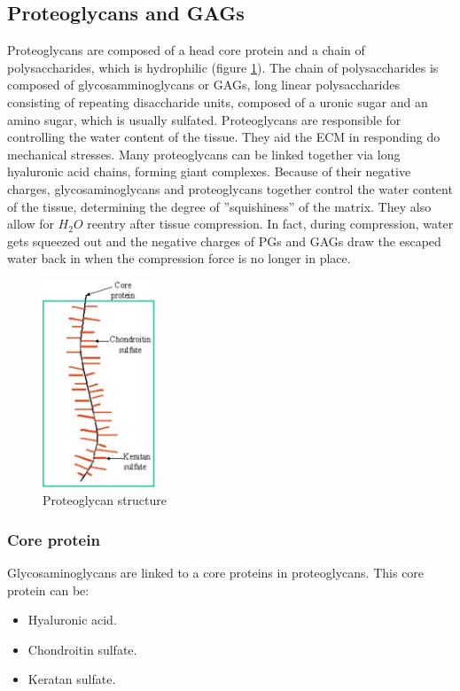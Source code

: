 	\subsection{Proteoglycans and GAGs}
	Proteoglycans are composed of a head core protein and a chain of polysaccharides, which is hydrophilic (figure \ref{fig:pgag}).
	The chain of polysaccharides is composed of glycosamminoglycans or GAGs, long linear polysaccharides consisting of repeating disaccharide units, composed of a uronic sugar and an amino sugar, which is usually sulfated.
	Proteoglycans are responsible for controlling the water content of the tissue.
	They aid the ECM in responding do mechanical stresses.
	Many proteoglycans can be linked together via long hyaluronic acid chains, forming giant complexes.
	Because of their negative charges, glycosaminoglycans and proteoglycans together control the water content of the tissue, determining the degree of ”squishiness” of the matrix.
	They also allow for $H_2O$ reentry after tissue compression.
	In fact, during compression, water gets squeezed out and the negative charges of PGs and GAGs draw the escaped water back in when the compression force is no longer in place.

	\begin{figure}[ht]
		\centering
		\includegraphics[width=0.3\textwidth]{pgag}
		\caption{\label{fig:pgag} Proteoglycan structure}
	\end{figure}


		\subsubsection{Core protein}
		Glycosaminoglycans are linked to a core proteins in proteoglycans.
		This core protein can be:

		\begin{multicols}{2}
			\begin{itemize}
				\item Hyaluronic acid.
				\item Chondroitin sulfate.
				\item Keratan sulfate.
			\end{itemize}
		\end{multicols}

